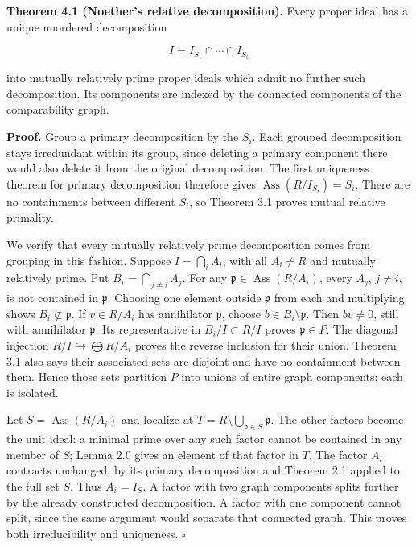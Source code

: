\documentclass[
]{article}
\begin{document}
\textbf{Theorem 4.1 (Noether's relative decomposition).} Every proper
ideal has a unique unordered decomposition

\[
I=I_{S_1}\cap\cdots\cap I_{S_t}
\]

into mutually relatively prime proper ideals which admit no further such
decomposition. Its components are indexed by the connected components of
the comparability graph.

\textbf{Proof.} Group a primary decomposition by the \(S_i\). Each
grouped decomposition stays irredundant within its group, since deleting
a primary component there would also delete it from the original
decomposition. The first uniqueness theorem for primary decomposition
therefore gives \(\operatorname{Ass}(R/I_{S_i})=S_i\). There are no
containments between different \(S_i\), so Theorem 3.1 proves mutual
relative primality.

We verify that every mutually relatively prime decomposition comes from
grouping in this fashion. Suppose \(I=\bigcap_i A_i\), with all
\(A_i\ne R\) and mutually relatively prime. Put
\(B_i=\bigcap_{j\ne i}A_j\). For any
\(\mathfrak p\in\operatorname{Ass}(R/A_i)\), every \(A_j\), \(j\ne i\),
is not contained in \(\mathfrak p\). Choosing one element outside
\(\mathfrak p\) from each and multiplying shows
\(B_i\not\subset\mathfrak p\). If \(v\in R/A_i\) has annihilator
\(\mathfrak p\), choose \(b\in B_i\setminus\mathfrak p\). Then
\(bv\ne0\), still with annihilator \(\mathfrak p\). Its representative
in \(B_i/I\subset R/I\) proves \(\mathfrak p\in P\). The diagonal
injection \(R/I\hookrightarrow\bigoplus R/A_i\) proves the reverse
inclusion for their union. Theorem 3.1 also says their associated sets
are disjoint and have no containment between them. Hence those sets
partition \(P\) into unions of entire graph components; each is
isolated.

Let \(S=\operatorname{Ass}(R/A_i)\) and localize at
\(T=R\setminus\bigcup_{\mathfrak p\in S}\mathfrak p\). The other factors
become the unit ideal: a minimal prime over any such factor cannot be
contained in any member of \(S\); Lemma 2.0 gives an element of that
factor in \(T\). The factor \(A_i\) contracts unchanged, by its primary
decomposition and Theorem 2.1 applied to the full set \(S\). Thus
\(A_i=I_S\). A factor with two graph components splits further by the
already constructed decomposition. A factor with one component cannot
split, since the same argument would separate that connected graph. This
proves both irreducibility and uniqueness. \(\square\)
\end{document}

